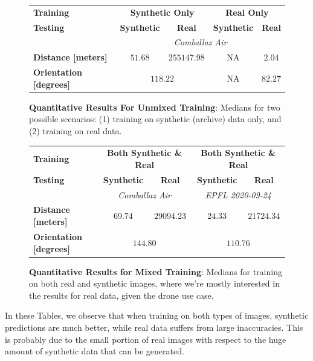 \documentclass[10pt,conference,compsocconf]{IEEEtran}
\begin{document}
\begin{figure}[hbpt]
\centering
\scriptsize
\begin{tabular}{@{}lcccc@{}}
\toprule
{\bf Training}& \multicolumn{2}{c}{\textbf{Synthetic Only}} & \multicolumn{2}{c}{\textbf{Real Only}} \\
{\bf Testing} & {\bf Synthetic} & {\bf Real}& {\bf Synthetic} & {\bf Real} \\
\midrule
&\multicolumn{4}{c}{\it Comballaz Air}\\
\cmidrule{2-5}
{\bf Distance [meters]}& $51.68$ & $255147.98$  & NA & $2.04$   \\
{\bf Orientation [degrees]}& \multicolumn{2}{c}{$118.22$}  & NA & $82.27$   \\
\bottomrule
\end{tabular}
\caption{\textbf{Quantitative Results For Unmixed Training}: Medians for two possible scenarios: (1) training on synthetic (archive) data only,  and (2) training on real data.}
\label{tab:unmixed}
\end{figure}


\begin{figure}[hbpt]
\centering
\scriptsize
\begin{tabular}{@{}lcccc@{}}
\toprule
{\bf Training} & \multicolumn{2}{c}{\textbf{Both Synthetic \&{} Real}} & \multicolumn{2}{c}{\textbf{Both Synthetic \&{} Real}} \\
{\bf Testing} & {\bf Synthetic} & {\bf Real} & {\bf Synthetic} & {\bf Real} \\
\midrule
&\multicolumn{2}{c}{\it Comballaz Air}&\multicolumn{2}{c}{\it EPFL 2020-09-24}\\
\cmidrule{2-3} \cmidrule{4-5}
{\bf Distance [meters]}& $69.74$ & $29094.23$ & $24.33$ & $21724.34$  \\
{\bf Orientation [degrees]}& \multicolumn{2}{c}{$144.80$} & \multicolumn{2}{c}{$110.76$}    \\
\bottomrule
\end{tabular}
\caption{\textbf{Quantitative Results for Mixed Training}: Medians for training on both real and synthetic images, where we're mostly interested in the results for real data, given the drone use case.}
\label{tab:mixed}
\end{figure}

In these Tables, we observe that when training on both types of images, synthetic predictions are much better, while real data suffers from large inaccuracies. This is probably due to the small portion of real images with respect to the huge amount of synthetic data that can be generated.
\end{document}
